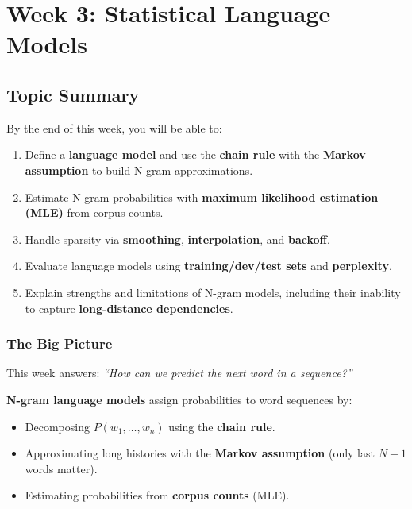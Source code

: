\section{Week 3: Statistical Language Models}

\subsection{Topic Summary}

\begin{keybox}
By the end of this week, you will be able to:
\begin{enumerate}
  \item Define a \textbf{language model} and use the \textbf{chain rule} with the \textbf{Markov assumption} to build N-gram approximations.
  \item Estimate N-gram probabilities with \textbf{maximum likelihood estimation (MLE)} from corpus counts.
  \item Handle sparsity via \textbf{smoothing}, \textbf{interpolation}, and \textbf{backoff}.
  \item Evaluate language models using \textbf{training/dev/test sets} and \textbf{perplexity}.
  \item Explain strengths and limitations of N-gram models, including their inability to capture \textbf{long-distance dependencies}.
\end{enumerate}
\end{keybox}

\separator

\subsubsection*{The Big Picture}

This week answers: \textit{``How can we predict the next word in a sequence?''}

\textbf{N-gram language models} assign probabilities to word sequences by:
\begin{itemize}
  \item Decomposing $P(w_1, \ldots, w_n)$ using the \textbf{chain rule}.
  \item Approximating long histories with the \textbf{Markov assumption} (only last $N-1$ words matter).
  \item Estimating probabilities from \textbf{corpus counts} (MLE).
\end{itemize}

